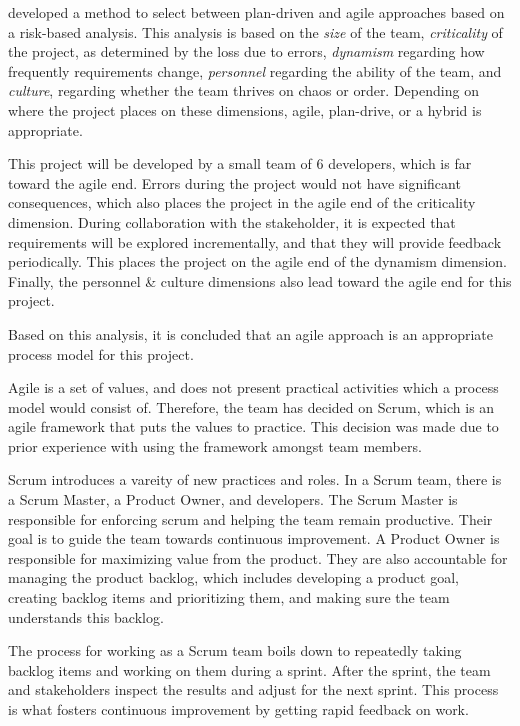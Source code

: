  developed a method to select between plan-driven and agile approaches based on a risk-based analysis.
This analysis is based on the \textit{size} of the team, \textit{criticality} of the project, as determined by the loss due to errors, \textit{dynamism} regarding how frequently requirements change, \textit{personnel} regarding the ability of the team, and \textit{culture}, regarding whether the team thrives on chaos or order. Depending on where the project places on these dimensions, agile, plan-drive, or a hybrid is appropriate.

This project will be developed by a small team of 6 developers, which is far toward the agile end.
Errors during the project would not have significant consequences, which also places the project in the agile end of the criticality dimension.
During collaboration with the stakeholder, it is expected that requirements will be explored incrementally, and that they will provide feedback periodically. This places the project on the agile end of the dynamism dimension.
Finally, the personnel \& culture dimensions also lead toward the agile end for this project.\cite{boehmObservationsBalancingDiscipline}

Based on this analysis, it is concluded that an agile approach is an appropriate process model for this project.

Agile is a set of values, and does not present practical activities which a process model would consist of. Therefore, the team has decided on Scrum, which is an agile framework that puts the values to practice. This decision was made due to prior experience with using the framework amongst team members.

Scrum introduces a vareity of new practices and roles. In a Scrum team, there is a Scrum Master, a Product Owner, and developers. The Scrum Master is responsible for enforcing scrum and helping the team remain productive. Their goal is to guide the team towards continuous improvement. A Product Owner is responsible for maximizing value from the product. They are also accountable for managing the product backlog, which includes developing a product goal, creating backlog items and prioritizing them, and making sure the team understands this backlog.

The process for working as a Scrum team boils down to repeatedly taking backlog items and working on them during a sprint. After the sprint, the team and stakeholders inspect the results and adjust for the next sprint. This process is what fosters continuous improvement by getting rapid feedback on work.

